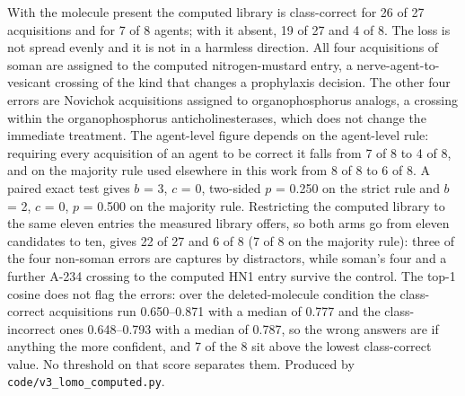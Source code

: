 \begin{table}[htbp]
\begin{flushleft}\footnotesize With the molecule present the computed library is class-correct for 26 of 27 acquisitions and for 7 of 8 agents; with it absent, 19 of 27 and 4 of 8. The loss is not spread evenly and it is not in a harmless direction. All four acquisitions of soman are assigned to the computed nitrogen-mustard entry, a nerve-agent-to-vesicant crossing of the kind that changes a prophylaxis decision. The other four errors are Novichok acquisitions assigned to organophosphorus analogs, a crossing within the organophosphorus anticholinesterases, which does not change the immediate treatment. The agent-level figure depends on the agent-level rule: requiring every acquisition of an agent to be correct it falls from 7 of 8 to 4 of 8, and on the majority rule used elsewhere in this work from 8 of 8 to 6 of 8. A paired exact test gives $b$ = 3, $c$ = 0, two-sided $p$ = 0.250 on the strict rule and $b$ = 2, $c$ = 0, $p$ = 0.500 on the majority rule. Restricting the computed library to the same eleven entries the measured library offers, so both arms go from eleven candidates to ten, gives 22 of 27 and 6 of 8 (7 of 8 on the majority rule): three of the four non-soman errors are captures by distractors, while soman's four and a further A-234 crossing to the computed HN1 entry survive the control. The top-1 cosine does not flag the errors: over the deleted-molecule condition the class-correct acquisitions run 0.650--0.871 with a median of 0.777 and the class-incorrect ones 0.648--0.793 with a median of 0.787, so the wrong answers are if anything the more confident, and 7 of the 8 sit above the lowest class-correct value. No threshold on that score separates them. Produced by \texttt{code/v3\_lomo\_computed.py}.\end{flushleft}
\end{table}
